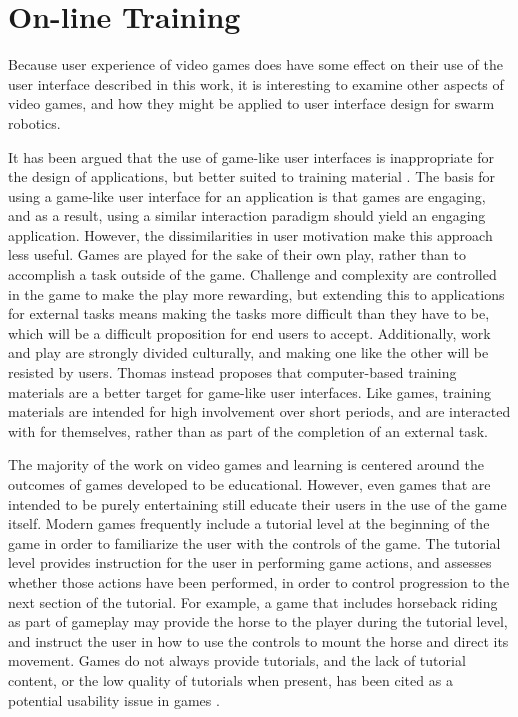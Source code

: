 \section{On-line Training}

Because user experience of video games does have some effect on their use of the user interface described in this work, it is interesting to examine other aspects of video games, and how they might be applied to user interface design for swarm robotics. 

It has been argued that the use of game-like user interfaces is inappropriate for the design of applications, but better suited to training material \citep{thomas1994games}. The basis for using a game-like user interface for an application is that games are engaging, and as a result, using a similar interaction paradigm should yield an engaging application. 
However, the dissimilarities in user motivation make this approach less useful. 
Games are played for the sake of their own play, rather than to accomplish a task outside of the game. 
Challenge and complexity are controlled in the game to make the play more rewarding, but extending this to applications for external tasks means making the tasks more difficult than they have to be, which will be a difficult proposition for end users to accept. 
Additionally, work and play are strongly divided culturally, and making one like the other will be resisted by users. 
Thomas instead proposes that computer-based training materials are a better target for game-like user interfaces. 
Like games, training materials are intended for high involvement over short periods, and are interacted with for themselves, rather than as part of the completion of an external task. 

The majority of the work on video games and learning is centered around the outcomes of games developed to be educational. 
However, even games that are intended to be purely entertaining still educate their users in the use of the game itself.
Modern games frequently include a tutorial level at the beginning of the game in order to familiarize the user with the controls of the game. 
The tutorial level provides instruction for the user in performing game actions, and assesses whether those actions have been performed, in order to control progression to the next section of the tutorial. 
For example, a game that includes horseback riding as part of gameplay may provide the horse to the player during the tutorial level, and instruct the user in how to use the controls to mount the horse and direct its movement. 
Games do not always provide tutorials, and the lack of tutorial content, or the low quality of tutorials when present, has been cited as a potential usability issue in games \citep{pinelle2008heuristic}.

